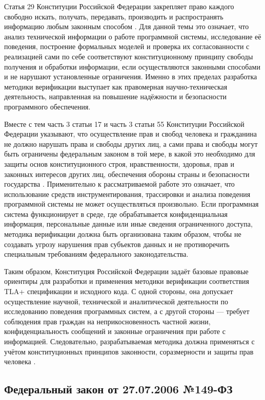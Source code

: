 Статья 29 Конституции Российской Федерации закрепляет право каждого
свободно искать, получать, передавать, производить и распространять
информацию любым законным способом \cite{constitution_rf}. Для данной темы
это означает, что анализ технической информации о работе программной
системы, исследование её поведения, построение формальных моделей и
проверка их согласованности с реализацией сами по себе соответствуют
конституционному принципу свободы получения и обработки информации, если
осуществляются законными способами и не нарушают установленные ограничения.
Именно в этих пределах разработка методики верификации выступает как
правомерная научно-техническая деятельность, направленная на повышение
надёжности и безопасности программного обеспечения.

Вместе с тем часть 3 статьи 17 и часть 3 статьи 55 Конституции Российской
Федерации указывают, что осуществление прав и свобод человека и гражданина
не должно нарушать права и свободы других лиц, а сами права и свободы
могут быть ограничены федеральным законом в той мере, в какой это
необходимо для защиты основ конституционного строя, нравственности,
здоровья, прав и законных интересов других лиц, обеспечения обороны страны
и безопасности государства \cite{constitution_rf}. Применительно к
рассматриваемой работе это означает, что использование средств
инструментирования, трассировки и анализа поведения программной системы не
может осуществляться произвольно. Если программная система функционирует в
среде, где обрабатывается конфиденциальная информация, персональные данные
или иные сведения ограниченного доступа, методика верификации должна быть
организована таким образом, чтобы не создавать угрозу нарушения прав
субъектов данных и не противоречить специальным требованиям федерального
законодательства.

Таким образом, Конституция Российской Федерации задаёт базовые правовые
ориентиры для разработки и применения методики верификации соответствия
TLA+ спецификации и исходного кода. С одной стороны, она допускает
осуществление научной, технической и аналитической деятельности по
исследованию поведения программных систем, а с другой стороны --- требует
соблюдения прав граждан на неприкосновенность частной жизни,
конфиденциальность сообщений и законные ограничения при работе с
информацией. Следовательно, разрабатываемая методика должна применяться с
учётом конституционных принципов законности, соразмерности и защиты прав
человека \cite{constitution_rf}.

\subsection{Федеральный закон от 27.07.2006 №149-ФЗ}


